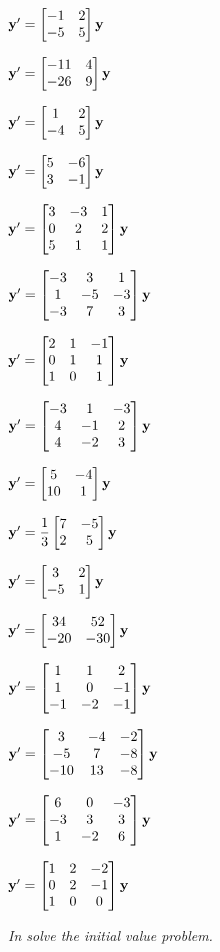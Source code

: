 \begin{exerciselistTwoColumn}

\item\label{exer:10.6.1}$\mathbf{y}'=\begin{bmatrix}-1&2\\-5&5\end{bmatrix}\mathbf{y}$
\item\label{exer:10.6.2}$\mathbf{y}'=\begin{bmatrix}-11&4\\-26&9\end{bmatrix}\mathbf{y}$
\item\label{exer:10.6.3}$\mathbf{y}'=\begin{bmatrix}1&2\\-4&5\end{bmatrix}\mathbf{y}$
\item\label{exer:10.6.4}$\mathbf{y}'=\begin{bmatrix}5&-6\\3&-1\end{bmatrix}\mathbf{y}$
\item\label{exer:10.6.5}$\mathbf{y}'=\begin{bmatrix}3&-3&1\\0&2&2\\5&1&1\end{bmatrix}\mathbf{y}$
\item\label{exer:10.6.6}$\mathbf{y}'=\begin{bmatrix}-3&3&1\\1&-5&-3\\-3&7&3\end{bmatrix}\mathbf{y}$
\item\label{exer:10.6.7}$\mathbf{y}'=\begin{bmatrix}2&1&-1\\0&1&1\\1&0&1\end{bmatrix}\mathbf{y}$
\item\label{exer:10.6.8}$\mathbf{y}'=\begin{bmatrix}-3&1&-3\\4&-1&2\\4&-2&3\end{bmatrix}\mathbf{y}$
\item\label{exer:10.6.9}$\mathbf{y}'=\begin{bmatrix}5&-4\\10&1\end{bmatrix}\mathbf{y}$
\item\label{exer:10.6.10}$\mathbf{y}'=\dfrac{1}{3}\begin{bmatrix}7&-5\\2&5\end{bmatrix}\mathbf{y}$
\item\label{exer:10.6.11}$\mathbf{y}'=\begin{bmatrix}3&2\\-5&1\end{bmatrix}\mathbf{y}$
\item\label{exer:10.6.12}$\mathbf{y}'=\begin{bmatrix}34&52\\-20&-30\end{bmatrix}\mathbf{y}$
\item\label{exer:10.6.13}$\mathbf{y}'=\begin{bmatrix}1&1&2\\1&0&-1\\-1&-2&-1\end{bmatrix}\mathbf{y}$
\item\label{exer:10.6.14}$\mathbf{y}'=\begin{bmatrix}3&-4&-2\\-5&7&-8\\-10&13&-8\end{bmatrix}\mathbf{y}$
\item\label{exer:10.6.15}$\mathbf{y}'=\begin{bmatrix}6&0&-3\\-3&3&3\\1&-2&6\end{bmatrix}\mathbf{y}$
\item\label{exer:10.6.16}$\mathbf{y}'=\begin{bmatrix}1&2&-2\\0&2&-1\\1&0&0\end{bmatrix}\mathbf{y}$
\end{exerciselistTwoColumn}
%
\textsl{In 
solve the initial value problem.}
